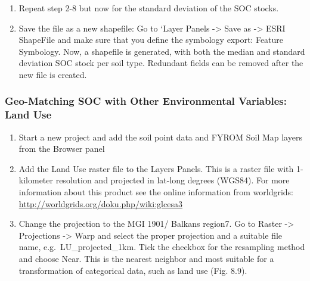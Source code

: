 \documentclass[10pt,b5paper,]{book}
\providecommand{\tightlist}{%
  \setlength{\itemsep}{0pt}\setlength{\parskip}{0pt}}
\theoremstyle{definition}
\theoremstyle{definition}
\theoremstyle{definition}
\theoremstyle{remark}
\begin{document}
\begin{enumerate}
\def\labelenumi{\arabic{enumi}.}
\setcounter{enumi}{9}
\tightlist
\item
  Repeat step 2-8 but now for the standard deviation of the SOC stocks.
\item
  Save the file as a new shapefile: Go to `Layer Panels -\textgreater{}
  Save as -\textgreater{} ESRI ShapeFile and make sure that you define
  the symbology export: Feature Symbology. Now, a shapefile is
  generated, with both the median and standard deviation SOC stock per
  soil type. Redundant fields can be removed after the new file is
  created.
\end{enumerate}

\hypertarget{geo-matching-soc-with-other-environmental-variables-land-use}{%
\subsubsection{Geo-Matching SOC with Other Environmental Variables: Land
Use}\label{geo-matching-soc-with-other-environmental-variables-land-use}}

\begin{enumerate}
\def\labelenumi{\arabic{enumi}.}
\tightlist
\item
  Start a new project and add the soil point data and FYROM Soil Map
  layers from the Browser panel
\item
  Add the Land Use raster file to the Layers Panels. This is a raster
  file with 1-kilometer resolution and projected in lat-long degrees
  (WGS84). For more information about this product see the online
  information from worldgrids:
  \url{http://worldgrids.org/doku.php/wiki:glcesa3}
\item
  Change the projection to the MGI 1901/ Balkans region7. Go to Raster
  -\textgreater{} Projections -\textgreater{} Warp and select the proper
  projection and a suitable file name, e.g.~LU\_projected\_1km. Tick the
  checkbox for the resampling method and choose Near. This is the
  nearest neighbor and most suitable for a transformation of categorical
  data, such as land use (Fig. 8.9).
\end{enumerate}
\end{document}
